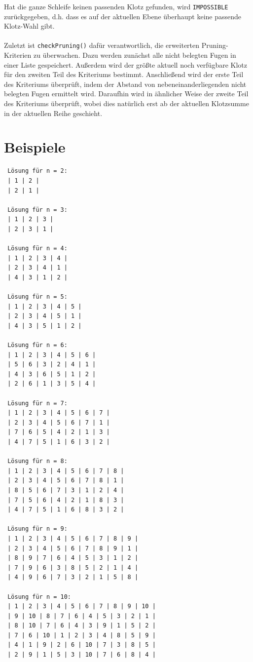 \documentclass[a4paper, notitlepage, 12pt]{scrartcl}
\begin{document}
Hat die ganze Schleife keinen passenden Klotz gefunden, wird \texttt{IMPOSSIBLE} zurückgegeben, d.h. dass es auf der aktuellen Ebene überhaupt keine passende Klotz-Wahl gibt.
\\ \\
Zuletzt ist \texttt{checkPruning()} dafür verantwortlich, die erweiterten Pruning-Kriterien zu überwachen. Dazu werden zunächst alle nicht belegten Fugen in einer Liste gespeichert. Außerdem wird der größte aktuell noch verfügbare Klotz für den zweiten Teil des Kriteriums bestimmt. Anschließend wird der erste Teil des Kriteriums überprüft, indem der Abstand von nebeneinanderliegenden nicht belegten Fugen ermittelt wird. Daraufhin wird in ähnlicher Weise der zweite Teil des Kriteriums überprüft, wobei dies natürlich erst ab der aktuellen Klotzsumme in der aktuellen Reihe geschieht.
\newpage
\section{Beispiele}
 \begin{multicols}{2}
 \begin{verbatim}
 Lösung für n = 2: 
 | 1 | 2 | 
 | 2 | 1 |
 
 Lösung für n = 3:
 | 1 | 2 | 3 | 
 | 2 | 3 | 1 |
 
 Lösung für n = 4: 
 | 1 | 2 | 3 | 4 | 
 | 2 | 3 | 4 | 1 | 
 | 4 | 3 | 1 | 2 |
 
 Lösung für n = 5: 
 | 1 | 2 | 3 | 4 | 5 | 
 | 2 | 3 | 4 | 5 | 1 | 
 | 4 | 3 | 5 | 1 | 2 |
 
 Lösung für n = 6: 
 | 1 | 2 | 3 | 4 | 5 | 6 | 
 | 5 | 6 | 3 | 2 | 4 | 1 | 
 | 4 | 3 | 6 | 5 | 1 | 2 | 
 | 2 | 6 | 1 | 3 | 5 | 4 |
 
 Lösung für n = 7:
 | 1 | 2 | 3 | 4 | 5 | 6 | 7 | 
 | 2 | 3 | 4 | 5 | 6 | 7 | 1 | 
 | 7 | 6 | 5 | 4 | 2 | 1 | 3 | 
 | 4 | 7 | 5 | 1 | 6 | 3 | 2 | 
 
 Lösung für n = 8:
 | 1 | 2 | 3 | 4 | 5 | 6 | 7 | 8 | 
 | 2 | 3 | 4 | 5 | 6 | 7 | 8 | 1 | 
 | 8 | 5 | 6 | 7 | 3 | 1 | 2 | 4 | 
 | 7 | 5 | 6 | 4 | 2 | 1 | 8 | 3 | 
 | 4 | 7 | 5 | 1 | 6 | 8 | 3 | 2 | 
 
 Lösung für n = 9:
 | 1 | 2 | 3 | 4 | 5 | 6 | 7 | 8 | 9 | 
 | 2 | 3 | 4 | 5 | 6 | 7 | 8 | 9 | 1 | 
 | 8 | 9 | 7 | 6 | 4 | 5 | 3 | 1 | 2 | 
 | 7 | 9 | 6 | 3 | 8 | 5 | 2 | 1 | 4 | 
 | 4 | 9 | 6 | 7 | 3 | 2 | 1 | 5 | 8 | 
 
 Lösung für n = 10:
 | 1 | 2 | 3 | 4 | 5 | 6 | 7 | 8 | 9 | 10 | 
 | 9 | 10 | 8 | 7 | 6 | 4 | 5 | 3 | 2 | 1 | 
 | 8 | 10 | 7 | 6 | 4 | 3 | 9 | 1 | 5 | 2 | 
 | 7 | 6 | 10 | 1 | 2 | 3 | 4 | 8 | 5 | 9 | 
 | 4 | 1 | 9 | 2 | 6 | 10 | 7 | 3 | 8 | 5 | 
 | 2 | 9 | 1 | 5 | 3 | 10 | 7 | 6 | 8 | 4 | 
 \end{verbatim}
 \end{multicols}
\end{document}

